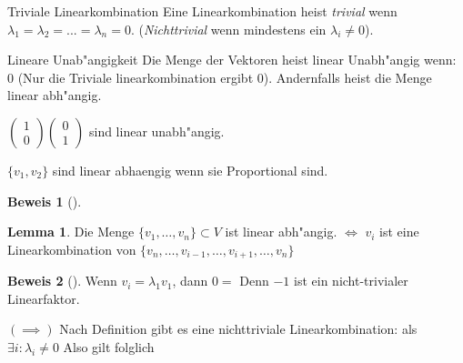 \documentclass[oneside,fontsize=11pt,paper=a4,BCOR=0mm,DIV=12,automark,headsepline]{scrbook}
\theoremstyle{remark}
\theoremstyle{definition}
\newtheorem{lemma}{Lemma}[section]
\theoremstyle{definition}
\newtheorem*{prof}{Beweis}
\theoremstyle{remark}
\begin{document}
\begin{definition}{Triviale Linearkombination}{}
  Eine Linearkombination heist \emph{trivial} wenn \(\lambda_1 = \lambda_2 = ... =
  \lambda_n = 0\). (\emph{Nichttrivial} wenn mindestens ein \(\lambda_i\not= 0\)).
\end{definition}


\begin{definition}{Lineare Unab"angigkeit}{}
  Die Menge der Vektoren heist linear Unabh"angig wenn: $0$ (Nur die Triviale
  linearkombination ergibt 0). Andernfalls heist die Menge linear abh"angig.
\end{definition}

\begin{exa}
  \(\begin{pmatrix}1\\0\end{pmatrix}\begin{pmatrix}0\\1\end{pmatrix}\) sind linear unabh"angig.
\end{exa}

\begin{exa}
  \(\{v_1,v_2\}\) sind linear abhaengig wenn sie Proportional sind.

  \begin{prof}[]

  \end{prof}
\end{exa}

\begin{lemma}
  Die Menge \(\{v_1, \dots, v_n\}\subset V\) ist linear abh"angig. $\iff$  $v_i$ ist eine Linearkombination von $\{v_n, \dots, v_{i-1}, \dots, v_{i+1}, \dots, v_n\}$
\end{lemma}

\begin{prof}[]
  Wenn \(v_i=\lambda_1 v_1\), dann \(0=\) Denn \(-1\) ist ein nicht-trivialer
  Linearfaktor.

  \((\implies)\) Nach Definition gibt es eine nichttriviale Linearkombination: als
  \(\exists i : \lambda_i \not= 0\) Also gilt  folglich 
\end{prof}
\end{document}
